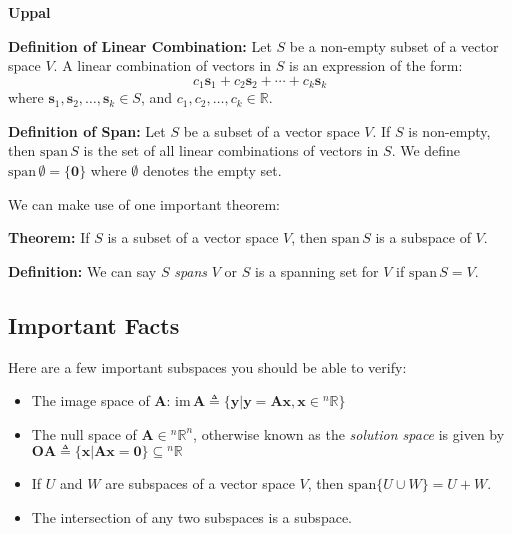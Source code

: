 \documentclass{article}
\newcommand{\bff}[1]{\mathbf{#1}}
\newcommand{\image}[1]{\mathrm{im}\,#1}
\newcommand{\spann}[1]{\mathrm{span}\{#1\}}
\newcommand{\spannn}[1]{\mathrm{span}\,#1}
\begin{document}
    \begin{minipage}[t]{.45\textwidth} %
        \begin{center}
            \textbf{Uppal}
        \end{center}
        \textbf{Definition of Linear Combination:} Let $S$ be a non-empty subset of a vector space $V$. A linear combination of vectors in $S$ is an expression of the form:
        \begin{equation*}
            c_1\bff{s}_1+c_2\bff{s}_2+\cdots+c_k\bff{s}_k
        \end{equation*}
        where $\bff{s}_1,\bff{s}_2,\dots,\bff{s}_k \in S$, and $c_1,c_2,\dots,c_k \in \mathbb{R}$.
        \vspace{7.5mm}

        \textbf{Definition of Span:} Let $S$ be a subset of a vector space $V$. If $S$ is non-empty, then $\spannn{S}$ is the set of all linear combinations of vectors in $S$. We define $\spannn{\emptyset}=\{\bff{0}\}$ where $\emptyset$ denotes the empty set.
        \vspace{11mm}

        We can make use of one important theorem:
        \vspace{2mm}

        \textbf{Theorem:} If $S$ is a subset of a vector space $V$, then $\spannn{S}$ is a subspace of $V$.
        \vspace{1mm}

        \textbf{Definition:} We can say $S$ \textit{spans} $V$ or $S$ is a spanning set for $V$ if $\spannn S = V$.
    \end{minipage}
    \subsection{Important Facts}
    Here are a few important subspaces you should be able to verify:
    \begin{itemize}
        \item The image space of $\bff{A}$: $\image \bff{A} \triangleq \{\bff{y} | \bff{y} = \bff{Ax}, \bff{x}\in {}^n\mathbb{R}\}$
        \item The null space of $\bff{A} \in {}^n\mathbb{R}^n$, otherwise known as the \textit{solution space} is given by $\bff{OA} \triangleq \{\bff{x}|\bff{Ax}=\bff{0}\} \subseteq {}^n\mathbb{R}$
        \item If $U$ and $W$ are subspaces of a vector space $V$, then $\spann{U \cup W} = U + W$.
        \item The intersection of any two subspaces is a subspace.
    \end{itemize}
\end{document}
